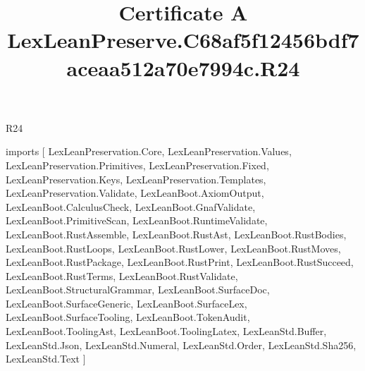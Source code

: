 \begin{lexlean}{R24}
\title{Certificate A LexLeanPreserve.C68af5f12456bdf7aceaa512a70e7994c.R24}
\begin{coremodule}
imports [
  LexLeanPreservation.Core,
  LexLeanPreservation.Values,
  LexLeanPreservation.Primitives,
  LexLeanPreservation.Fixed,
  LexLeanPreservation.Keys,
  LexLeanPreservation.Templates,
  LexLeanPreservation.Validate,
  LexLeanBoot.AxiomOutput,
  LexLeanBoot.CalculusCheck,
  LexLeanBoot.GnafValidate,
  LexLeanBoot.PrimitiveScan,
  LexLeanBoot.RuntimeValidate,
  LexLeanBoot.RustAssemble,
  LexLeanBoot.RustAst,
  LexLeanBoot.RustBodies,
  LexLeanBoot.RustLoops,
  LexLeanBoot.RustLower,
  LexLeanBoot.RustMoves,
  LexLeanBoot.RustPackage,
  LexLeanBoot.RustPrint,
  LexLeanBoot.RustSucceed,
  LexLeanBoot.RustTerms,
  LexLeanBoot.RustValidate,
  LexLeanBoot.StructuralGrammar,
  LexLeanBoot.SurfaceDoc,
  LexLeanBoot.SurfaceGeneric,
  LexLeanBoot.SurfaceLex,
  LexLeanBoot.SurfaceTooling,
  LexLeanBoot.TokenAudit,
  LexLeanBoot.ToolingAst,
  LexLeanBoot.ToolingLatex,
  LexLeanStd.Buffer,
  LexLeanStd.Json,
  LexLeanStd.Numeral,
  LexLeanStd.Order,
  LexLeanStd.Sha256,
  LexLeanStd.Text
]


\end{coremodule}
\end{lexlean}
